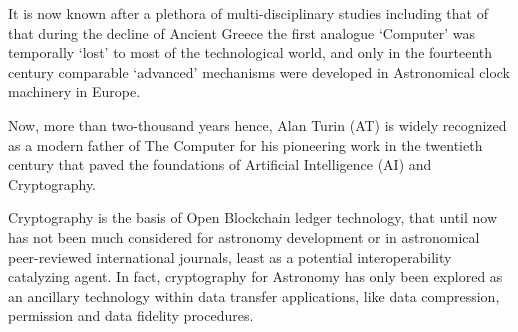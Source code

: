 \documentclass[final,5p,times,twocolumn,authoryear]{elsarticle}
\begin{document}
 It is now known after a plethora of multi-disciplinary studies including that of \citet{Freeth2021} that during the decline of Ancient Greece the first analogue `Computer' was temporally `lost' to most of the technological world, and only in the fourteenth century comparable `advanced' mechanisms were developed in Astronomical clock machinery in Europe. 
 
 Now, more than two-thousand years hence, Alan Turin (AT) is widely recognized as a modern father of The Computer for his pioneering  work in the twentieth century that paved the foundations of Artificial Intelligence (AI) and Cryptography. 
 
Cryptography is the basis of Open Blockchain ledger technology, that until now has not been much considered for astronomy development or in astronomical peer-reviewed international journals, least as a potential interoperability catalyzing agent. In fact, cryptography for Astronomy has only been explored as an ancillary technology within data transfer applications, like data compression, permission and data fidelity procedures.
\end{document}
